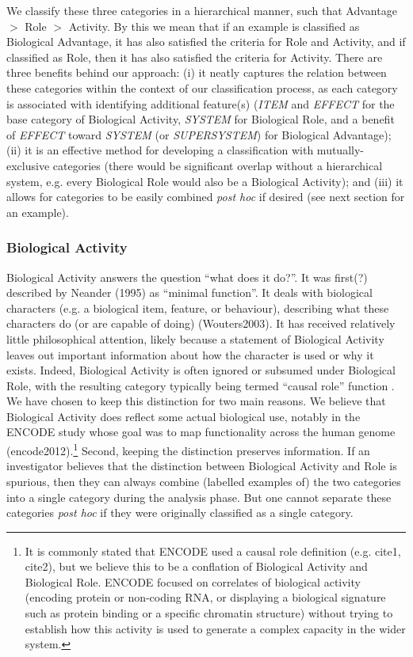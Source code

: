 \documentclass{article}
\begin{document}
We classify these three categories in a hierarchical manner, such that Advantage $>$ Role $>$ Activity.
By this we mean that if an example is classified as Biological Advantage, it has also satisfied the criteria for Role and Activity, and if classified as Role, then it has also satisfied the criteria for Activity.
There are three benefits behind our approach: (i) it neatly captures the relation between these categories within the context of our classification process, as each category is associated with identifying additional feature(s) (\emph{ITEM} and \emph{EFFECT} for the base category of Biological Activity, \emph{SYSTEM} for Biological Role, and a benefit of \emph{EFFECT} toward \emph{SYSTEM} (or \emph{SUPERSYSTEM}) for Biological Advantage); (ii) it is an effective method for developing a classification with mutually-exclusive categories (there would be significant overlap without a hierarchical system, e.g. every Biological Role would also be a Biological Activity); and (iii) it allows for categories to be easily combined \emph{post hoc} if desired (see next section for an example).

\subsubsection{Biological Activity}
\label{sec:biological-activity-1}

Biological Activity answers the question ``what does it do?''.
It was first(?) described by Neander (1995) as ``minimal function''.
It deals with biological characters (e.g. a biological item, feature, or behaviour), describing what these characters do (or are capable of doing) (Wouters2003).
It has received relatively little philosophical attention, likely because a statement of Biological Activity leaves out important information about how the character is used or why it exists.
Indeed, Biological Activity is often ignored or subsumed under Biological Role, with the resulting category typically being termed ``causal role'' function \cite{cummins1975} .
We have chosen to keep this distinction for two main reasons.
We believe that Biological Activity does reflect some actual biological use, notably in the ENCODE study whose goal was to map functionality across the human genome (encode2012).\footnote{It is commonly stated that ENCODE used a causal role definition (e.g. cite1, cite2), but we believe this to be a conflation of Biological Activity and Biological Role. ENCODE focused on correlates of biological activity (encoding protein or non-coding RNA, or displaying a biological signature such as protein binding or a specific chromatin structure) without trying to establish how this activity is used to generate a complex capacity in the wider system.}
Second, keeping the distinction preserves information.
If an investigator believes that the distinction between Biological Activity and Role is spurious, then they can always combine (labelled examples of) the two categories into a single category during the analysis phase.
But one cannot separate these categories \emph{post hoc} if they were originally classified as a single category.
\end{document}
